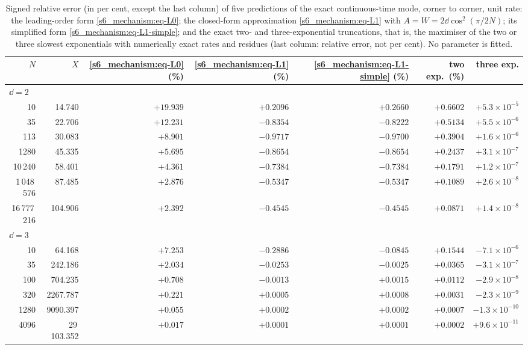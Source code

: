 \begin{table}[tbp]
\centering
\caption{Signed relative error (in per cent, except the last column) of five predictions of the exact
continuous-time mode, corner to corner, unit rate: the leading-order form \eqref{s6_mechanism:eq-L0}; the
closed-form approximation \eqref{s6_mechanism:eq-L1} with $A=W=2\dd\cos^{2}(\pi/2N)$; its simplified form
\eqref{s6_mechanism:eq-L1-simple}; and the exact two- and three-exponential truncations, that is, the maximiser of
the two or three slowest exponentials with numerically exact rates and residues (last column: relative error, not
per cent). No parameter is fitted.}
\label{s6_mechanism:tab-accuracy}
\small
\begin{tabular}{rrrrrrr}
\toprule
$N$ & $X$ & \eqref{s6_mechanism:eq-L0} (\%) & \eqref{s6_mechanism:eq-L1} (\%) & \eqref{s6_mechanism:eq-L1-simple} (\%) & two exp.\ (\%) & three exp.\\
\midrule
\multicolumn{7}{l}{$\dd=2$}\\
10 & 14.740 & $+19.939$ & $+0.2096$ & $+0.2660$ & $+0.6602$ & $+5.3\times10^{-5}$ \\
35 & 22.706 & $+12.231$ & $-0.8354$ & $-0.8222$ & $+0.5134$ & $+5.5\times10^{-6}$ \\
113 & 30.083 & $+8.901$ & $-0.9717$ & $-0.9700$ & $+0.3904$ & $+1.6\times10^{-6}$ \\
1280 & 45.335 & $+5.695$ & $-0.8654$ & $-0.8654$ & $+0.2437$ & $+3.1\times10^{-7}$ \\
10\,240 & 58.401 & $+4.361$ & $-0.7384$ & $-0.7384$ & $+0.1791$ & $+1.2\times10^{-7}$ \\
1\,048\,576 & 87.485 & $+2.876$ & $-0.5347$ & $-0.5347$ & $+0.1089$ & $+2.6\times10^{-8}$ \\
16\,777\,216 & 104.906 & $+2.392$ & $-0.4545$ & $-0.4545$ & $+0.0871$ & $+1.4\times10^{-8}$ \\
\midrule
\multicolumn{7}{l}{$\dd=3$}\\
10 & 64.168 & $+7.253$ & $-0.2886$ & $-0.0845$ & $+0.1544$ & $-7.1\times10^{-6}$ \\
35 & 242.186 & $+2.034$ & $-0.0253$ & $-0.0025$ & $+0.0365$ & $-3.1\times10^{-7}$ \\
100 & 704.235 & $+0.708$ & $-0.0013$ & $+0.0015$ & $+0.0112$ & $-2.9\times10^{-8}$ \\
320 & 2267.787 & $+0.221$ & $+0.0005$ & $+0.0008$ & $+0.0031$ & $-2.3\times10^{-9}$ \\
1280 & 9090.397 & $+0.055$ & $+0.0002$ & $+0.0002$ & $+0.0007$ & $-1.3\times10^{-10}$ \\
4096 & 29\,103.352 & $+0.017$ & $+0.0001$ & $+0.0001$ & $+0.0002$ & $+9.6\times10^{-11}$ \\
\bottomrule
\end{tabular}
\end{table}

